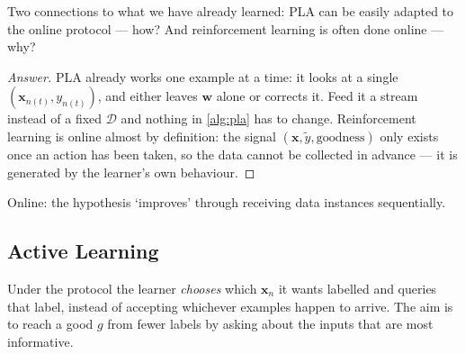 \begin{question}
    Two connections to what we have already learned: PLA can be easily adapted
    to the online protocol --- how? And reinforcement learning is often done
    online --- why?
\end{question}

\begin{proof}[Answer]
    PLA already works one example at a time: it looks at a single
    \((\bm{x}_{n(t)}, y_{n(t)})\), and either leaves \(\bm{w}\) alone or
    corrects it. Feed it a stream instead of a fixed \(\mathcal{D}\) and nothing
    in \autoref{alg:pla} has to change. Reinforcement learning is online almost
    by definition: the signal \((\bm{x}, \tilde{y}, \text{goodness})\) only
    exists once an action has been taken, so the data cannot be collected in
    advance --- it is generated by the learner's own behaviour.
\end{proof}

\begin{moral}
    Online: the hypothesis `improves' through receiving data instances
    sequentially.
\end{moral}

\subsection{Active Learning}

\begin{definition}\label{def:active}
    Under the  protocol the learner \emph{chooses} which
    \(\bm{x}_n\) it wants labelled and queries that label, instead of accepting
    whichever examples happen to arrive. The aim is to reach a good \(g\) from
    fewer labels by asking about the inputs that are most informative.
\end{definition}

